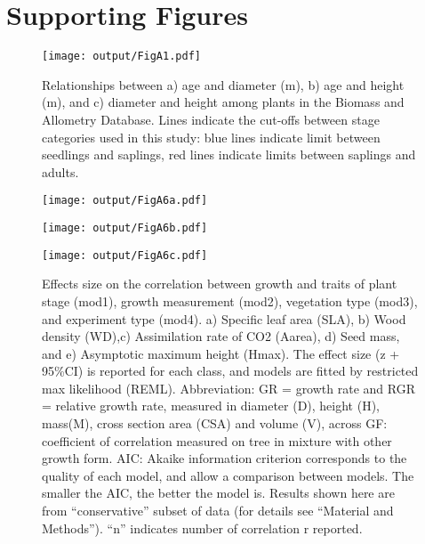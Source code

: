 \documentclass[10pt,twoside]{article}\usepackage[]{graphicx}\usepackage[]{color}
\date{}
\begin{document}
\maketitle

\tableofcontents

\renewcommand{\thefigure}{S\arabic{figure}}
\renewcommand{\thetable}{S\arabic{table}}

\section{Supporting Figures}\label{app:supp_info_figures}

\begin{figure}[h!]
\centering
\texttt{[image: output/FigA1.pdf]}
\caption{Relationships between a) age and diameter (m), b) age and height (m), and c) diameter and height among plants in the Biomass and Allometry Database. Lines indicate the cut-offs between stage categories used in this study: blue lines indicate limit between seedlings and saplings, red lines indicate limits between saplings and adults.}
\label{fig:figA1}
\end{figure}

\begin{figure}[h!]
\centering
\texttt{[image: output/FigA6a.pdf]}
\end{figure}

\begin{figure}[h!]
\centering
\texttt{[image: output/FigA6b.pdf]}
\end{figure}

\begin{figure}[h!]
\centering
\texttt{[image: output/FigA6c.pdf]}
\caption{Effects size on the correlation between growth and traits of plant stage (mod1), growth measurement (mod2), vegetation type (mod3), and experiment type (mod4). a) Specific leaf area (SLA), b) Wood density (WD),c) Assimilation rate of CO2 (Aarea), d) Seed mass, and e) Asymptotic maximum height (Hmax). The effect size (z + 95\%CI) is reported for each class, and models are fitted by restricted max likelihood (REML). Abbreviation: GR = growth rate and RGR = relative growth rate, measured in diameter (D), height (H), mass(M), cross section area (CSA) and volume (V), across GF: coefficient of correlation measured on tree in mixture with other growth form. AIC: Akaike information criterion corresponds to the quality of each model, and allow a comparison between models. The smaller the AIC, the better the model is. Results shown here are from ``conservative'' subset of data (for details see ``Material and Methods''). ``n'' indicates number of correlation r reported.}
\label{fig:figA6}
\end{figure}
\end{document}

